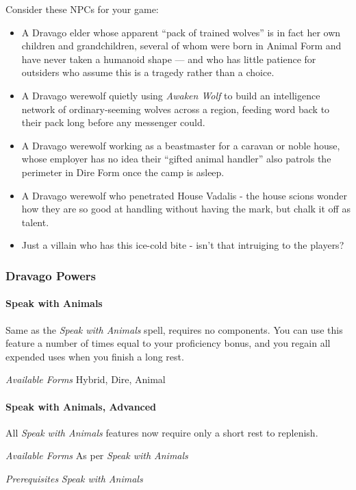 \documentclass[twocolumn]{dndbook}
\begin{document}
Consider these NPCs for your game:
\begin{itemize}
    \item A Dravago elder whose apparent ``pack of trained wolves'' is in fact her own children and grandchildren, several of whom were born in Animal Form and have never taken a humanoid shape --- and who has little patience for outsiders who assume this is a tragedy rather than a choice.
    \item A Dravago werewolf quietly using \emph{Awaken Wolf} to build an intelligence network of ordinary-seeming wolves across a region, feeding word back to their pack long before any messenger could.
    \item A Dravago werewolf working as a beastmaster for a caravan or noble house, whose employer has no idea their ``gifted animal handler'' also patrols the perimeter in Dire Form once the camp is asleep.
    \item A Dravago werewolf who penetrated House Vadalis - the house scions wonder how they are so good at handling without having the mark, but chalk it off as talent.
    \item Just a villain who has this ice-cold bite - isn't that intruiging to the players?
\end{itemize}


\subsubsection{Dravago Powers}

\paragraph*{Speak with Animals}
Same as the \emph{Speak with Animals} spell, requires no components.
You can use this feature a number of times equal to your proficiency bonus, and you regain all expended uses when you finish a long rest.\par
\emph{Available Forms} Hybrid, Dire, Animal\par

\paragraph*{Speak with Animals, Advanced}
All \emph{Speak with Animals} features now require only a short rest to replenish.\par
\emph{Available Forms} As per \emph{Speak with Animals} \par
\emph{Prerequisites} \emph{Speak with Animals}\par
\end{document}
